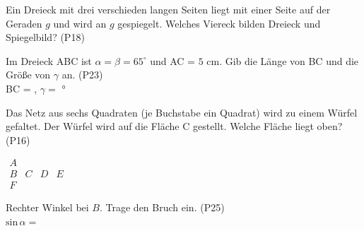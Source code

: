 \documentclass[11pt]{article}
\begin{document}
\begin{aufgabe}{Ein Dreieck mit drei verschieden langen Seiten liegt mit einer Seite auf der Geraden $g$ und wird an $g$ gespiegelt. Welches Viereck bilden Dreieck und Spiegelbild? \hfill (P18)}
\end{aufgabe}

\begin{aufgabe}{Im Dreieck ABC ist $\alpha = \beta = 65^\circ$ und AC = $5$ cm. Gib die Länge von BC und die Größe von $\gamma$ an. \hfill (P23) \\ BC = \leerfeld[cm] , $\gamma =$ \leerfeld °}
\end{aufgabe}

\begin{aufgabe}{\begin{minipage}[t]{0.6\linewidth}Das Netz aus sechs Quadraten (je Buchstabe ein Quadrat) wird zu einem Würfel gefaltet. Der Würfel wird auf die Fläche C gestellt. Welche Fläche liegt oben? \hfill (P16) \\ \leerfeld\end{minipage}\hfill\begin{minipage}[t]{0.37\linewidth}\vspace{0pt}
$\begin{array}{cccc} A &  &  &  \\ B & C & D & E \\ F &  &  &  \end{array}$
\end{minipage}}
\end{aufgabe}

\begin{aufgabe}{\begin{minipage}[t]{0.6\linewidth}Rechter Winkel bei $B$. Trage den Bruch ein. \hfill (P25) \\ $\mathrm{sin}\,\alpha =$ \leerfeld\end{minipage}\hfill\begin{minipage}[t]{0.37\linewidth}\vspace{0pt}
\end{minipage}}
\end{aufgabe}

\begleitteil
{}
\end{document}
